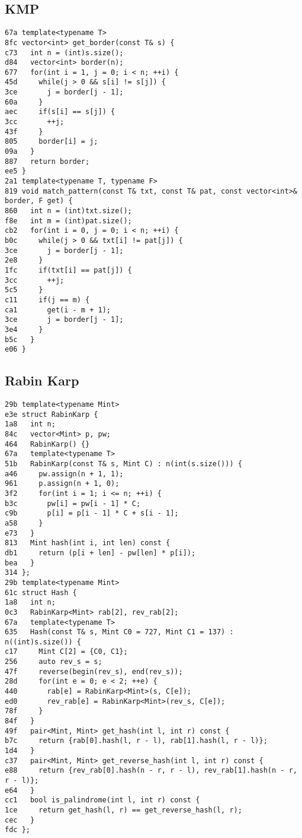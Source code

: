 \documentclass[10pt, a4paper, twoside]{article}
\begin{document}
\subsection{KMP}
\begin{lstlisting}
67a template<typename T>
8fc vector<int> get_border(const T& s) {
c73   int n = (int)s.size();
d84   vector<int> border(n);
677   for(int i = 1, j = 0; i < n; ++i) {
45d     while(j > 0 && s[i] != s[j]) {
3ce       j = border[j - 1];
60a     }
aec     if(s[i] == s[j]) {
3cc       ++j;
43f     }
805     border[i] = j;
09a   }
887   return border;
ee5 }
2a1 template<typename T, typename F>
819 void match_pattern(const T& txt, const T& pat, const vector<int>& border, F get) {
860   int n = (int)txt.size();
f8e   int m = (int)pat.size();
cb2   for(int i = 0, j = 0; i < n; ++i) {
b0c     while(j > 0 && txt[i] != pat[j]) {
3ce       j = border[j - 1];
2e8     }
1fc     if(txt[i] == pat[j]) {
3cc       ++j;
5c5     }
c11     if(j == m) {
ca1       get(i - m + 1);
3ce       j = border[j - 1];
3e4     }
b5c   }
e06 }
\end{lstlisting}

\subsection{Rabin Karp}
\begin{lstlisting}
29b template<typename Mint>
e3e struct RabinKarp {
1a8   int n;
84c   vector<Mint> p, pw;
464   RabinKarp() {}
67a   template<typename T>
51b   RabinKarp(const T& s, Mint C) : n(int(s.size())) {
a46     pw.assign(n + 1, 1);
961     p.assign(n + 1, 0);
3f2     for(int i = 1; i <= n; ++i) {
b3c       pw[i] = pw[i - 1] * C;
c9b       p[i] = p[i - 1] * C + s[i - 1];
a58     }
e73   }
813   Mint hash(int i, int len) const {
db1     return (p[i + len] - pw[len] * p[i]);
bea   }
314 };
29b template<typename Mint>
61c struct Hash {
1a8   int n;
0c3   RabinKarp<Mint> rab[2], rev_rab[2];
67a   template<typename T>
635   Hash(const T& s, Mint C0 = 727, Mint C1 = 137) : n((int)s.size()) {
c17     Mint C[2] = {C0, C1};
256     auto rev_s = s;
47f     reverse(begin(rev_s), end(rev_s));
28d     for(int e = 0; e < 2; ++e) {
440       rab[e] = RabinKarp<Mint>(s, C[e]);
ed0       rev_rab[e] = RabinKarp<Mint>(rev_s, C[e]);
78f     }
84f   }
49f   pair<Mint, Mint> get_hash(int l, int r) const {
b7c     return {rab[0].hash(l, r - l), rab[1].hash(l, r - l)};
1d4   }
c37   pair<Mint, Mint> get_reverse_hash(int l, int r) const {
e88     return {rev_rab[0].hash(n - r, r - l), rev_rab[1].hash(n - r, r - l)};
e64   }
cc1   bool is_palindrome(int l, int r) const {
1ce     return get_hash(l, r) == get_reverse_hash(l, r);
cec   }
fdc };
\end{lstlisting}
\end{document}
